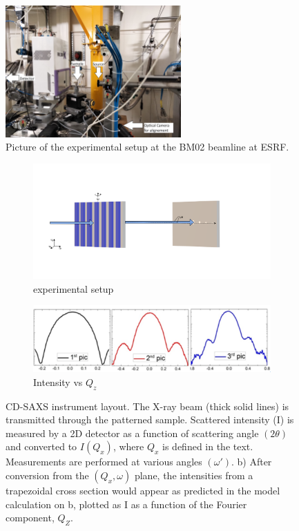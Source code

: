 \begin{figure}[h]
\centering
\includegraphics[width=0.6\textwidth]{images/photo_exp.jpg}
\caption{Picture of the experimental setup at the BM02 beamline at ESRF.}
\label{fig:exp_setup_real}
\end{figure}%
\begin{figure}[h]
    \centering
    \begin{subfigure}[b]{0.8\textwidth}
        \includegraphics[width=\textwidth]{images/cdsaxs_diff.png}
        \caption{experimental setup}
        \label{fig:exp_setup}
    \end{subfigure}
    
    \begin{subfigure}[b]{0.4\textwidth}
        \includegraphics[width=\textwidth]{images/intensity_qz.png}
        \caption{Intensity vs $Q_z$}
    \end{subfigure}
    
    \caption{CD-SAXS instrument layout. The X-ray beam (thick solid lines) is transmitted through the 
    patterned sample. Scattered intensity (I) is measured by a 2D detector as a function of scattering angle $(2\theta)$ 
    and converted to $I(Q_{x})$, where $Q_{x}$ is defined in the text. Measurements are performed at various angles $(\omega')$. b) After conversion from the $(Q_{x},\omega)$
    plane, the intensities from a trapezoidal cross section would appear as predicted in
   the model calculation on b, plotted as I as a function of the
   Fourier component, $Q_{Z}$.}
   \label{fig:isolated_line}
\end{figure}

